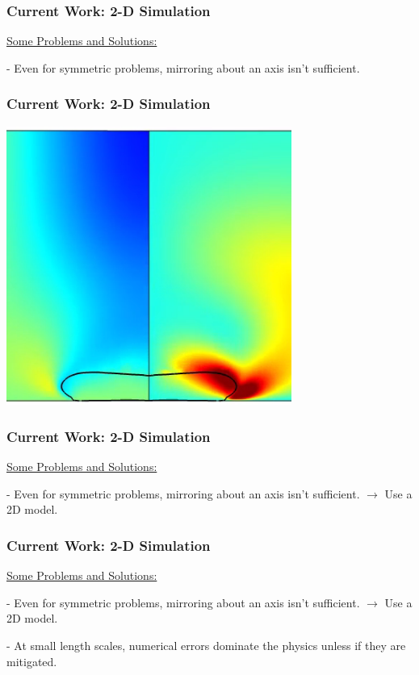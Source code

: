 \documentclass[12pt]{beamer}
\begin{document}
\begin{frame}
    \frametitle{Current Work: 2-D Simulation}
    \underline{Some Problems and Solutions:}

    - Even for symmetric problems, mirroring about an axis isn't sufficient.
\end{frame}
\begin{frame}
    \frametitle{Current Work: 2-D Simulation}

    \includegraphics[width=0.7\textwidth]{img/11-pillowing.png}
\end{frame}
\begin{frame}
    \frametitle{Current Work: 2-D Simulation}
    \underline{Some Problems and Solutions:}

    - Even for symmetric problems, mirroring about an axis isn't sufficient.
    $\rightarrow$ Use a 2D model.
\end{frame}
\begin{frame}
    \frametitle{Current Work: 2-D Simulation}
    \underline{Some Problems and Solutions:}

    - Even for symmetric problems, mirroring about an axis isn't sufficient.
    $\rightarrow$ Use a 2D model.

    - At small length scales, numerical errors dominate the physics unless if 
    they are mitigated.
\end{frame}
\end{document}
